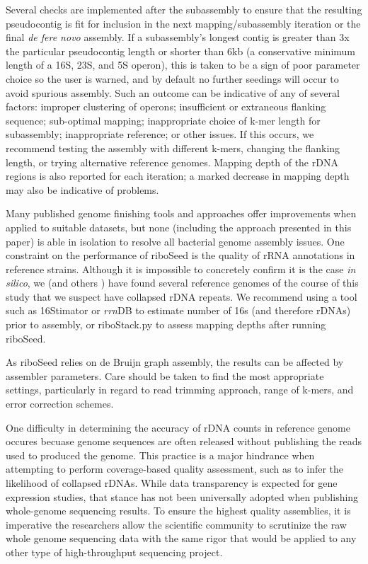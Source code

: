 \documentclass[10pt]{article}
\begin{document}
\begin{linenumbers}
Several checks are implemented after the subassembly to ensure that the resulting pseudocontig is fit for inclusion in the next mapping/subassembly iteration or the final \textit{de fere novo} assembly. If a subassembly's longest contig is greater than 3x the particular pseudocontig length or shorter than 6kb (a conservative minimum length of a 16S, 23S, and 5S operon), this is taken to be a sign of poor parameter choice so the user is warned, and by default no further seedings will occur to avoid spurious assembly. Such an outcome can be indicative of any of several factors: improper clustering of operons; insufficient or extraneous flanking sequence; sub-optimal mapping; inappropriate choice of k-mer length for subassembly; inappropriate reference; or other issues. If this occurs, we recommend testing the assembly with different k-mers, changing the flanking length, or trying alternative reference genomes. Mapping depth of the rDNA regions is also reported for each iteration; a marked decrease in mapping depth may also be indicative of problems.


Many published genome finishing tools and approaches offer improvements when applied to suitable datasets, but none (including the approach presented in this paper) is able in isolation to resolve all bacterial genome assembly issues. One constraint on the performance of riboSeed is the quality of rRNA annotations in reference strains. Although it is impossible to concretely confirm it is the case \textit{in silico}, we (and others \cite{Mariano2016}) have found several reference genomes of the course of this study that we suspect have collapsed rDNA repeats. We recommend using a tool such as 16Stimator\cite{Perisin2016} or \textit{rrn}DB\cite{Stoddard2014} to estimate number of 16s (and therefore rDNAs) prior to assembly, or riboStack.py to assess mapping depths after running riboSeed.

As riboSeed relies on de Bruijn graph assembly, the results can be affected by assembler parameters. Care should be taken to find the most appropriate settings, particularly in regard to read trimming approach, range of k-mers, and error correction schemes.

One difficulty in determining the accuracy of rDNA counts in reference genome occures becuase genome sequences are often released without publishing the reads used to produced the genome. This practice is a major hindrance when attempting to perform coverage-based quality assessment, such as to infer the likelihood of collapsed rDNAs. While data transparency is expected for gene expression studies, that stance has not been universally adopted when publishing whole-genome sequencing results. To ensure the highest quality assemblies, it is imperative the researchers allow the scientific community to scrutinize the raw whole genome sequencing data with the same rigor that would be applied to any other type of high-throughput sequencing project.




\end{linenumbers}
\end{document}
